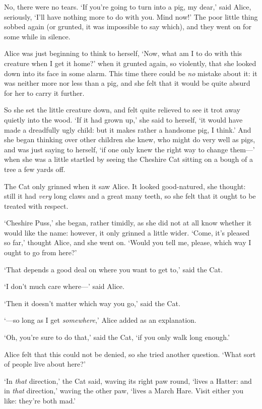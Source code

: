 \documentclass[12pt,openany]{memoir}
\begin{document}
No, there were no tears. `If you're going to turn into a pig, my dear,' said Alice, seriously, `I'll have nothing more to do with you. Mind now!' The poor little thing sobbed again (or grunted, it was impossible to say which), and they went on for some while in silence.

Alice was just beginning to think to herself, `Now, what am I to do with this creature when I get it home?' when it grunted again, so violently, that she looked down into its face in some alarm. This time there could be \textit{no} mistake about it: it was neither more nor less than a pig, and she felt that it would be quite absurd for her to carry it further.

So she set the little creature down, and felt quite relieved to see it trot away quietly into the wood. `If it had grown up,' she said to herself, `it would have made a dreadfully ugly child: but it makes rather a handsome pig, I think.' And she began thinking over other children she knew, who might do very well as pigs, and was just saying to herself, `if one only knew the right way to change them---' when she was a little startled by seeing the Cheshire Cat sitting on a bough of a tree a few yards off.

The Cat only grinned when it saw Alice. It looked good-natured, she thought: still it had \textit{very} long claws and a great many teeth, so she felt that it ought to be treated with respect.

`Cheshire Puss,' she began, rather timidly, as she did not at all know whether it would like the name: however, it only grinned a little wider. `Come, it's pleased so far,' thought Alice, and she went on. `Would you tell me, please, which way I ought to go from here?'

`That depends a good deal on where you want to get to,' said the Cat.

`I don't much care where---' said Alice.

`Then it doesn't matter which way you go,' said the Cat.

`---so long as I get \textit{somewhere},' Alice added as an explanation.

`Oh, you're sure to do that,' said the Cat, `if you only walk long enough.'

Alice felt that this could not be denied, so she tried another question. `What sort of people live about here?'

`In \textit{that} direction,' the Cat said, waving its right paw round, `lives a Hatter: and in \textit{that} direction,' waving the other paw, `lives a March Hare. Visit either you like: they're both mad.'
\end{document}
